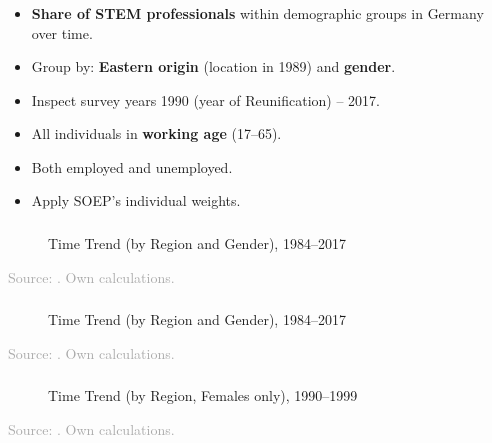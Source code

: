 \documentclass[11pt, aspectratio=1610, xcolor={dvipsnames}]{beamer}
\newcommand{\highlight}[1]{\textbf{\textcolor{PineGreen}{#1}}}
\begin{document}
	\begin{frame}
		\frametitle{}
		
		\begin{itemize}
			\item \highlight{Share of STEM professionals} within demographic groups in Germany over time.
			\item Group by: \highlight{Eastern origin} (location in 1989) and \highlight{gender}.
			\item Inspect survey years 1990 (year of Reunification) -- 2017.
			\item All individuals in \highlight{working age} (17--65).
			\item Both employed and unemployed.
			\item Apply SOEP's individual weights.
		\end{itemize}
		
	\end{frame}
		
	\begin{frame}
		\frametitle{}
		
		\begin{figure}[h]
			\centering
			\caption{Time Trend (by Region and Gender), 1984--2017}
			\label{fig:trend}
			\resizebox{75mm}{!}{}
		\end{figure}
		
		{\scriptsize
			\textcolor{darkgray}{Source: \cite{SOEP2023}. Own calculations.}
		}
	
	\end{frame}
	
	\begin{frame}
		\frametitle{}
		
		\hypertarget{graph}{}
		
		\begin{figure}[h]
			\centering
			\caption{Time Trend (by Region and Gender), 1984--2017}
			\label{fig:trend_highlight}
			\resizebox{75mm}{!}{}
		\end{figure}
		
		{\scriptsize
			\textcolor{darkgray}{Source: \cite{SOEP2023}. Own calculations.}
		}
		
	\end{frame}
	
	\begin{frame}
		\frametitle{}
		
		\begin{figure}[h]
			\centering
			\caption{Time Trend (by Region, Females only), 1990--1999}
			\label{fig:trend_zoomed}
			\resizebox{75mm}{!}{}
		\end{figure}
		
		{\scriptsize
			\textcolor{darkgray}{Source: \cite{SOEP2023}. Own calculations.}
		}
		
	\end{frame}
	
\end{document}
